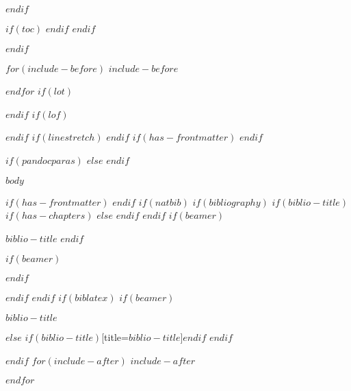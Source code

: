 \documentclass[
$if(fontsize)$
  $fontsize$,
$endif$
$if(lang)$
  $babel-lang$,
$endif$
$if(papersize)$
  $papersize$paper,
$endif$
$if(beamer)$
  ignorenonframetext,
$if(handout)$
  handout,
$endif$
$if(aspectratio)$
  aspectratio=$aspectratio$,
$endif$
$endif$
$if(twocolumn)$
twocolumn,
$endif$
$for(classoption)$
  $classoption$$sep$,
$endfor$
]{$documentclass$}
\newif\ifbibliography
\begin{document}
    
    $endif$

    $if(toc)$
    {
    \makeatletter\renewcommand*\l@section{\@dottedtocline{1}{1.5em}{2.3em}}\makeatother
    \makeatletter\renewcommand*\l@subsection{\@dottedtocline{1}{2.5em}{2.3em}}
    \makeatother
    \hypersetup{linkcolor=black}
    \setcounter{tocdepth}{$toc-depth$}
    \tableofcontents
    \vfill
    \clearpage
    }
    $endif$
    \vfill
    \clearpage
    $endif$

$endif$ %

$for(include-before)$
$include-before$

$endfor$
$if(lot)$
\listoftables
$endif$
$if(lof)$
\listoffigures
$endif$
$if(linestretch)$
$endif$
$if(has-frontmatter)$
\mainmatter
$endif$

$if(pandocparas)$
$else$
\setlength{\parindent}{16pt}
\setlength{\parskip}{0pt}
$endif$


$body$

$if(has-frontmatter)$
\backmatter
$endif$
$if(natbib)$
$if(bibliography)$
$if(biblio-title)$
$if(has-chapters)$
\renewcommand\bibname{$biblio-title$}
$else$
\renewcommand\refname{$biblio-title$}
$endif$
$endif$
$if(beamer)$
\begin{frame}[allowframebreaks]{$biblio-title$}
  \bibliographytrue
$endif$
  
$if(beamer)$
\end{frame}
$endif$

$endif$
$endif$
$if(biblatex)$
$if(beamer)$
\begin{frame}[allowframebreaks]{$biblio-title$}
  \bibliographytrue
  \printbibliography[heading=none]
\end{frame}
$else$
\thispagestyle{refstyle}
\printbibliography$if(biblio-title)$[title=$biblio-title$]$endif$
$endif$

$endif$
$for(include-after)$
$include-after$

$endfor$
\end{document}
